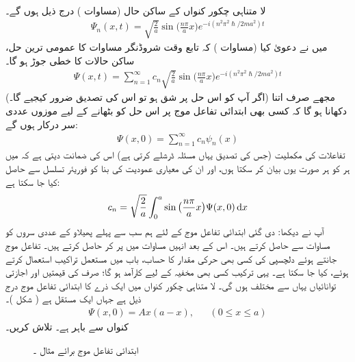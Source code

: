  لا متناہی چکور  کنواں کے ساکن حال (مساوات  ) درج ذیل ہوں گے۔ 
 \begin{align}
\Psi_{n}(x,t)=\sqrt{\frac{2}{a}}\sin\big(\frac{n\pi}{a}x\big)e^{-i(n^{2}\pi^{2}\hslash/2ma^{2})t}
\end{align}
 میں نے دعویٰ  کیا (مساوات  ) کہ تابع وقت شروڈنگر مساوات کا عمومی ترین حل، ساکن حالات کا خطی جوڑ ہو گا۔
\begin{align}\label{مساوات_شروڈنگر_ساکن_حالات_کا_مجموعہ}
\Psi(x,t)=\sum_{n=1}^{\infty}c_n\sqrt{\frac{2}{a}}\sin\big(\frac{n\pi}{a}x\big)e^{-i(n^{2}\pi^{2}\hslash/2ma^{2})t}
\end{align}  
 (اگر آپ کو اس حل پر شق ہو تو اس کی تصدیق ضرور کیجیے گا۔) مجھے صرف اتنا دکھانا ہو گا کہ کسی بھی ابتدائی تفاعل موج    پر اس حل کو   بٹھانے کے لیے  موزوں  عددی سر  درکار ہوں گے:
\begin{align*}
\Psi(x,0)=\sum_{n=1}^{\infty}c_{n}\psi_{n}(x)
\end{align*}
تفاعلات   کی مکملیت (جس کی تصدیق یہاں مسئلہ ڈرشلے کرتی ہے) اس کی ضمانت دیتی ہے کہ میں ہر    کو ہر صورت یوں بیان کر سکتا ہوں، اور ان کی معیاری عمودیت کی بنا    کو فوریئر تسلسل سے حاصل کیا جا سکتا ہے: 
\begin{align}\label{مساوات_شروڈنگر_عددی_سروں}
c_{n}=\sqrt{\frac{2}{a}}\int_{0}^{a}\sin\big(\frac{n\pi}{a}x\big)\Psi(x,0)\dif{x}
\end{align}
آپ نے دیکھا: دی گئی ابتدائی تفاعل موج  کے لئے ہم سب سے پہلے پھیلاو کے عددی سروں   کو مساوات  سے حاصل کرتے ہیں۔   اس کے بعد انہیں
 مساوات   میں پر کر  حاصل کرتے ہیں۔ تفاعل موج جانتے ہوئے  دلچسپی کی کسی بھی حرکی مقدار   کا حساب، باب   میں مستعمل تراکیب استعمال کرتے ہوئے، کیا جا سکتا ہے۔ یہی ترکیب کسی بھی مخفیہ کے لیے کارآمد ہو گا؛  صرف    کی  قیمتیں اور اجازتی توانائیاں یہاں سے مختلف  ہوں گی۔
لا متناہی چکور  کنواں میں ایک ذرے کا ابتدائی تفاعل موج درج ذیل ہے جہاں  ایک مستقل ہے ( شکل  )۔
\begin{align*}
\Psi(x,0)=Ax(a-x),&& (0\le x\le  a)
\end{align*}
 کنواں سے باہر   ہے۔   تلاش کریں۔ 
 \begin{figure}
\centering
{}
\caption{ابتدائی تفاعل موج برائے مثال ۔}
\label{شکل_غیر_تابع_ابتدائی_تفاعل_موج}
\end{figure}

